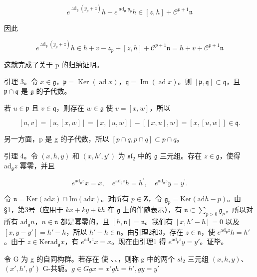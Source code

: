 \[
e ^ {\operatorname{ad} _ {\mathfrak {g}} \left(y _ {p} + z\right)} h - e ^ {\operatorname{ad} _ {\mathfrak {g}} y _ {p}} h \in [ z, h ] + \mathscr {C} ^ {p + 1} \mathfrak {n}
\]

因此

\[
e ^ {\operatorname{ad} _ {\mathfrak {g}} \left(y _ {p} + z\right)} h \in h + v - z _ {p} + [ z, h ] + \mathscr {C} ^ {p + 1} \mathfrak {n} = h + v + \mathscr {C} ^ {p + 1} \mathfrak {n}
\]

这就完成了关于 p 的归纳证明。

引理 3。令 \(x \in \mathfrak{g}\)，\(\mathfrak{p} = \operatorname{Ker}(\operatorname{ad}x)\)，\(\mathfrak{q} = \operatorname{Im}(\operatorname{ad}x)\)。则 \([\mathfrak{p}, \mathfrak{q}] \subset \mathfrak{q}\)，且 \(\mathfrak{p} \cap \mathfrak{q}\) 是 \(\mathfrak{g}\) 的子代数。

若 \(u \in \mathfrak{p}\) 且 \(v \in \mathfrak{q}\)，则存在 \(w \in \mathfrak{g}\) 使 \(v = [x, w]\)，所以

\[
[ u, v ] = [ u, [ x, w ] ] = [ x, [ u, w ] ] - [ [ x, u ], w ] = [ x, [ u, w ] ] \in \mathfrak {q}.
\]

另一方面，p 是 g 的子代数，所以 \([p \cap q, p \cap q] \subset p \cap q\)。

引理 4。令 \((x,h,y)\) 和 \((x,h',y')\) 为 \(\mathfrak{sl}_2\) 中的 \(\mathfrak{g}\) 三元组。存在 \(z\in \mathfrak{g}\)，使得 \(\mathrm{ad}_{\mathfrak{g}}z\) 幂零，并且

\[
e ^ {\mathrm{ad} _ {\mathfrak {g}} z} x = x, \quad e ^ {\mathrm{ad} _ {\mathfrak {g}} z} h = h ^ {\prime}, \quad e ^ {\mathrm{ad} _ {\mathfrak {g}} z} y = y ^ {\prime}.
\]

令 \(\mathfrak{n} = \mathrm{Ker}(\mathrm{ad} x) \cap \mathrm{Im}(\mathrm{ad} x)\)。对所有 \(p \in \mathbf{Z}\)，令 \(\mathfrak{g}_p = \mathrm{Ker}(\mathrm{ad} h - p)\)。由 §1，第3号（应用于 \(kx + ky + kh\) 在 \(\mathfrak{g}\) 上的伴随表示），有 \(\mathfrak{n} \subset \sum_{p > 0} \mathfrak{g}_p\)，所以对所有 \(\mathrm{ad}_{\mathfrak{g}} n\)，\(n \in \mathfrak{n}\) 都是幂零的，且 \([h, \mathfrak{n}] = \mathfrak{n}\)。我们有 \([x, h' - h] = 0\) 以及 \([x, y - y'] = h' - h\)，所以 \(h' - h \in \mathfrak{n}\)。由引理2和3，存在 \(z \in \mathfrak{n}\)，使 \(e^{\mathrm{ad}_{\mathfrak{g}} z} h = h'\)。由于 \(z \in \mathrm{Ker} \mathrm{ad}_{\mathfrak{g}} x\)，有 \(e^{\mathrm{ad}_{\mathfrak{g}} z} x = x\)。现在由引理1 得 \(e^{\mathrm{ad}_{\mathfrak{g}} z} y = y'\)。证毕。

令 G 为 g 的自同构群。若存在  使 、、，则称 g 中的两个 \(sl_{2}\) 三元组 \((x,h,y)\)、\((x',h',y')\) G-共轭。\(g\in G\)\(gx=x'\)\(gh=h',gy=y'\)

